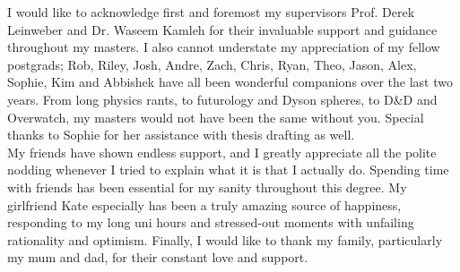 
\begin{acknowledgements}      


I would like to acknowledge first and foremost my supervisors Prof. Derek Leinweber and Dr. Waseem Kamleh for their invaluable support and guidance throughout my masters. I also cannot understate my appreciation of my fellow postgrads; Rob, Riley, Josh, Andre, Zach, Chris, Ryan, Theo, Jason, Alex, Sophie, Kim and Abbishek have all been wonderful companions over the last two years. From long physics rants, to futurology and Dyson spheres, to D\&D and Overwatch, my masters would not have been the same without you. Special thanks to Sophie for her assistance with thesis drafting as well.\\

My friends have shown endless support, and I greatly appreciate all the polite nodding whenever I tried to explain what it is that I actually do. Spending time with friends has been essential for my sanity throughout this degree. My girlfriend Kate especially has been a truly amazing source of happiness, responding to my long uni hours and stressed-out moments with unfailing rationality and optimism. Finally, I would like to thank my family, particularly my mum and dad, for their constant love and support.  


\end{acknowledgements}
